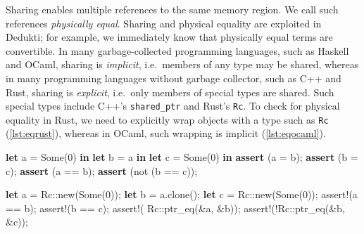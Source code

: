 \documentclass[screen,sigplan,10pt]{acmart}
\newenvironment{Shaded}{}{}
\newcommand{\ConstantTok}[1]{\textcolor[rgb]{0.53,0.00,0.00}{#1}}
\newcommand{\DataTypeTok}[1]{\textcolor[rgb]{0.56,0.13,0.00}{#1}}
\newcommand{\DecValTok}[1]{\textcolor[rgb]{0.25,0.63,0.44}{#1}}
\newcommand{\KeywordTok}[1]{\textcolor[rgb]{0.00,0.44,0.13}{\textbf{#1}}}
\newcommand{\NormalTok}[1]{#1}
\newcommand{\PreprocessorTok}[1]{\textcolor[rgb]{0.74,0.48,0.00}{#1}}
\begin{document}
Sharing enables multiple references to the same memory region. We call
such references \emph{physically equal}. Sharing and physical equality
are exploited in Dedukti; for example, we immediately know that
physically equal terms are convertible. In many garbage-collected
programming languages, such as Haskell and OCaml, sharing is
\emph{implicit}, i.e.~members of any type may be shared, whereas in many
programming languages without garbage collector, such as C++ and Rust,
sharing is \emph{explicit}, i.e.~only members of special types are
shared. Such special types include C++'s \texttt{shared\_ptr} and Rust's
\texttt{Rc}. To check for physical equality in Rust, we need to
explicitly wrap objects with a type such as \texttt{Rc}
(\autoref{lst:eqrust}), whereas in OCaml, such wrapping is implicit
(\autoref{lst:eqocaml}).

\begin{listing}\begin{Shaded}
\begin{Highlighting}[]
\KeywordTok{let}\NormalTok{ a = }\DataTypeTok{Some}\NormalTok{(}\DecValTok{0}\NormalTok{) }\KeywordTok{in}
\KeywordTok{let}\NormalTok{ b = a }\KeywordTok{in}
\KeywordTok{let}\NormalTok{ c = }\DataTypeTok{Some}\NormalTok{(}\DecValTok{0}\NormalTok{) }\KeywordTok{in}
\KeywordTok{assert}\NormalTok{ (a =  b);}
\KeywordTok{assert}\NormalTok{ (b =  c);}
\KeywordTok{assert}\NormalTok{ (a == b);}
\KeywordTok{assert}\NormalTok{ (}\DataTypeTok{not}\NormalTok{ (b == c));}
\end{Highlighting}
\end{Shaded}


\caption{Structural and physical equality in OCaml.}

\hypertarget{lst:eqocaml}{%
\label{lst:eqocaml}}%
\end{listing}

\begin{listing}\begin{Shaded}
\begin{Highlighting}[]
\KeywordTok{let}\NormalTok{ a = }\PreprocessorTok{Rc::}\NormalTok{new(}\ConstantTok{Some}\NormalTok{(}\DecValTok{0}\NormalTok{));}
\KeywordTok{let}\NormalTok{ b = a.clone();}
\KeywordTok{let}\NormalTok{ c = }\PreprocessorTok{Rc::}\NormalTok{new(}\ConstantTok{Some}\NormalTok{(}\DecValTok{0}\NormalTok{));}
\PreprocessorTok{assert!}\NormalTok{(a == b);}
\PreprocessorTok{assert!}\NormalTok{(b == c);}
\PreprocessorTok{assert!}\NormalTok{( }\PreprocessorTok{Rc::}\NormalTok{ptr_eq(&a, &b));}
\PreprocessorTok{assert!}\NormalTok{(!}\PreprocessorTok{Rc::}\NormalTok{ptr_eq(&b, &c));}
\end{Highlighting}
\end{Shaded}


\caption{Structural and physical equality in Rust.}

\hypertarget{lst:eqrust}{%
\label{lst:eqrust}}%
\end{listing}
\end{document}

